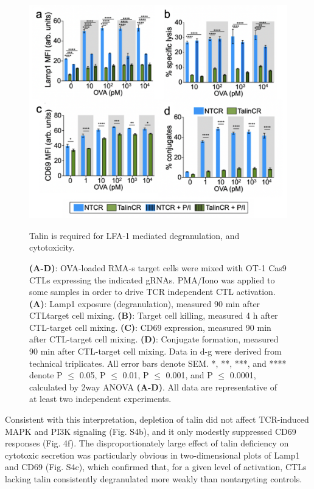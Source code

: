 \begin{figure}[htbp]
	\centering
	\includegraphics[width=1.0\columnwidth]{../figures/chapter3/fig4assays.png}
	\caption{Talin is required for LFA-1 mediated degranulation, and
cytotoxicity.}
	\caption*{\textbf{(A-D)}: OVA-loaded RMA-s target cells were mixed with OT-1 Cas9 CTLs expressing the indicated gRNAs. PMA/Iono was applied to some samples in order to drive TCR independent CTL activation. \textbf{(A)}: Lamp1 exposure (degranulation), measured 90 min after CTLtarget cell mixing. \textbf{(B)}: Target cell killing, measured 4 h after CTL-target cell mixing. \textbf{(C)}: CD69 expression, measured 90 min after CTL-target cell mixing. \textbf{(D)}: Conjugate formation, measured 90 min after CTL-target cell mixing. Data in d-g were derived from technical triplicates. All error bars denote SEM. *, **, ***, and **** denote P $\leq$ 0.05, P $\leq$ 0.01, P $\leq$ 0.001, and P $\leq$ 0.0001, calculated by 2way ANOVA \textbf{(A-D)}. All data are representative of at least two independent experiments.}
	\label{fig:fig4assays}
\end{figure} 

Consistent with this interpretation, depletion of talin did not affect TCR-induced MAPK and PI3K signaling (Fig. S4b), and it only modestly suppressed CD69 responses (Fig. 4f). The disproportionately large effect of talin deficiency on cytotoxic secretion was particularly obvious in two-dimensional plots of Lamp1 and CD69 (Fig. S4c), which confirmed that, for a given level of activation, CTLs lacking talin consistently degranulated more weakly than nontargeting controls. 

